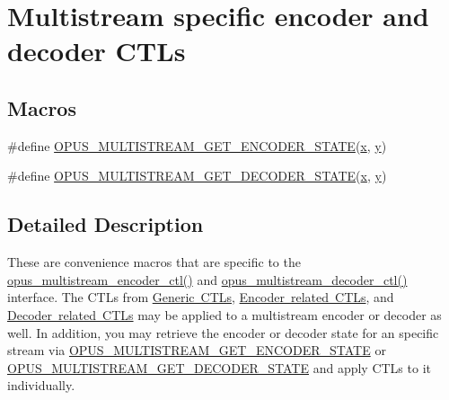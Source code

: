\hypertarget{group__opus__multistream__ctls}{}\section{Multistream specific encoder and decoder C\+T\+Ls}
\label{group__opus__multistream__ctls}
\subsection*{Macros}
\begin{DoxyCompactItemize}
\item 
\#define \mbox{\hyperlink{group__opus__multistream__ctls_ga4e67607eb691c4314a5de90d8c58aff0}{O\+P\+U\+S\+\_\+\+M\+U\+L\+T\+I\+S\+T\+R\+E\+A\+M\+\_\+\+G\+E\+T\+\_\+\+E\+N\+C\+O\+D\+E\+R\+\_\+\+S\+T\+A\+TE}}(\mbox{\hyperlink{_s_d_l__opengl_8h_ad0e63d0edcdbd3d79554076bf309fd47}{x}},  \mbox{\hyperlink{_s_d_l__opengl_8h_a1675d9d7bb68e1657ff028643b4037e3}{y}})
\item 
\#define \mbox{\hyperlink{group__opus__multistream__ctls_gaf0843831519b4d9b9d73391afef04a53}{O\+P\+U\+S\+\_\+\+M\+U\+L\+T\+I\+S\+T\+R\+E\+A\+M\+\_\+\+G\+E\+T\+\_\+\+D\+E\+C\+O\+D\+E\+R\+\_\+\+S\+T\+A\+TE}}(\mbox{\hyperlink{_s_d_l__opengl_8h_ad0e63d0edcdbd3d79554076bf309fd47}{x}},  \mbox{\hyperlink{_s_d_l__opengl_8h_a1675d9d7bb68e1657ff028643b4037e3}{y}})
\end{DoxyCompactItemize}


\subsection{Detailed Description}
These are convenience macros that are specific to the \mbox{\hyperlink{group__opus__multistream_ga0f8756c84c7c62a38f99fb5cd6ed68af}{opus\+\_\+multistream\+\_\+encoder\+\_\+ctl()}} and \mbox{\hyperlink{group__opus__multistream_ga3c6402c3bb276d7a152d9934ce948431}{opus\+\_\+multistream\+\_\+decoder\+\_\+ctl()}} interface. The C\+T\+Ls from \mbox{\hyperlink{group__opus__genericctls}{Generic C\+T\+Ls}}, \mbox{\hyperlink{group__opus__encoderctls}{Encoder related C\+T\+Ls}}, and \mbox{\hyperlink{group__opus__decoderctls}{Decoder related C\+T\+Ls}} may be applied to a multistream encoder or decoder as well. In addition, you may retrieve the encoder or decoder state for an specific stream via \mbox{\hyperlink{group__opus__multistream__ctls_ga4e67607eb691c4314a5de90d8c58aff0}{O\+P\+U\+S\+\_\+\+M\+U\+L\+T\+I\+S\+T\+R\+E\+A\+M\+\_\+\+G\+E\+T\+\_\+\+E\+N\+C\+O\+D\+E\+R\+\_\+\+S\+T\+A\+TE}} or \mbox{\hyperlink{group__opus__multistream__ctls_gaf0843831519b4d9b9d73391afef04a53}{O\+P\+U\+S\+\_\+\+M\+U\+L\+T\+I\+S\+T\+R\+E\+A\+M\+\_\+\+G\+E\+T\+\_\+\+D\+E\+C\+O\+D\+E\+R\+\_\+\+S\+T\+A\+TE}} and apply C\+T\+Ls to it individually. 

